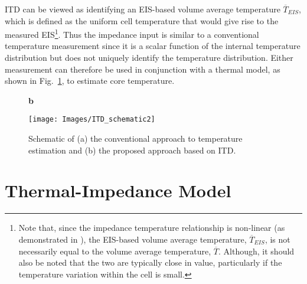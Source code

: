 \documentclass[journal, english]{IEEEtran}
\begin{document}
ITD can be viewed as identifying an EIS-based volume average temperature
$\overline{T}_{EIS}$, which is defined as the uniform cell temperature
that would give rise to the measured EIS\footnote{Note that, since the impedance temperature relationship is non-linear (as demonstrated in \cite{Troxler2013}), the EIS-based volume average temperature,
$\overline{T}_{EIS}$, is not necessarily equal to the volume average
temperature, $\overline{T}$. Although, it should also be noted that the two are typically close
in value, particularly if the temperature variation within the cell
is small. }. Thus the impedance input is similar to a conventional
temperature measurement since it is a scalar function of the internal
temperature distribution but does not uniquely identify the temperature
distribution. Either measurement can therefore be used in conjunction
with a thermal model, as shown in Fig.\ \ref{fig:Schematic}, to estimate core temperature.
\begin{figure}[h]
	{ \hspace{4cm} {\large\textbf{b}} \par\vspace{0.0cm}}
\begin{centering}
\texttt{[image: Images/ITD\_schematic2]}
\par\end{centering}
\caption{Schematic of (a) the conventional approach to temperature estimation and (b)
the proposed approach based on ITD.\label{fig:Schematic}}
\end{figure}

\section{Thermal-Impedance Model}
\end{document}
